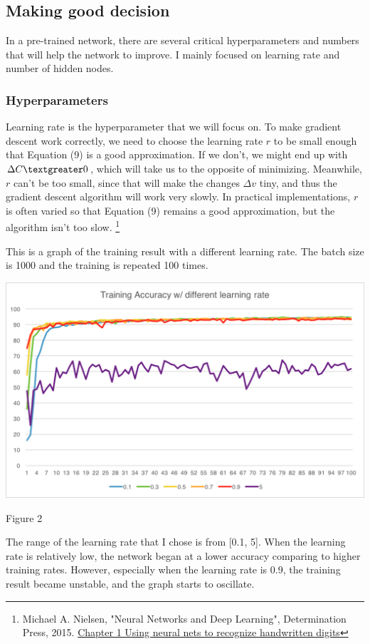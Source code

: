 \documentclass[]{article}
\begin{document}
\begin{multicols}{2}
\subsection{Making good decision}
In a pre-trained network, there are several critical hyperparameters and numbers that will help the network to improve. I mainly focused on learning rate and number of hidden nodes. 
\subsubsection{Hyperparameters}
Learning rate is the hyperparameter that we will focus on. To make gradient descent work correctly, we need to choose the learning rate \(r\) to be small enough that Equation (9) is a good approximation. If we don't, we might end up with \(\Delta C \textgreater 0\), which will take us to the opposite of minimizing. Meanwhile,  \(r\) can't be too small, since that will make the changes \(\Delta v\) tiny, and thus the gradient descent algorithm will work very slowly. In practical implementations, \(r\) is often varied so that Equation (9) remains a good approximation, but the algorithm isn't too slow. \footnote{Michael A. Nielsen, "Neural Networks and Deep Learning", Determination Press, 2015. \href{http://neuralnetworksanddeeplearning.com/chap1.html}{Chapter 1 Using neural nets to recognize handwritten digits}}

This is a graph of the training result with a different learning rate. The batch size is 1000 and the training is repeated 100 times. 

\centerline{\includegraphics[width=1\linewidth]{graph5}}
\centerline{Figure 2}
\vspace{0.3cm}

The range of the learning rate that I chose is from [0.1, 5]. When the learning rate is relatively low, the network began at a lower accuracy comparing to higher training rates. However, especially when the learning rate is 0.9, the training result became unstable, and the graph starts to oscillate. 


\end{multicols}
\end{document}

